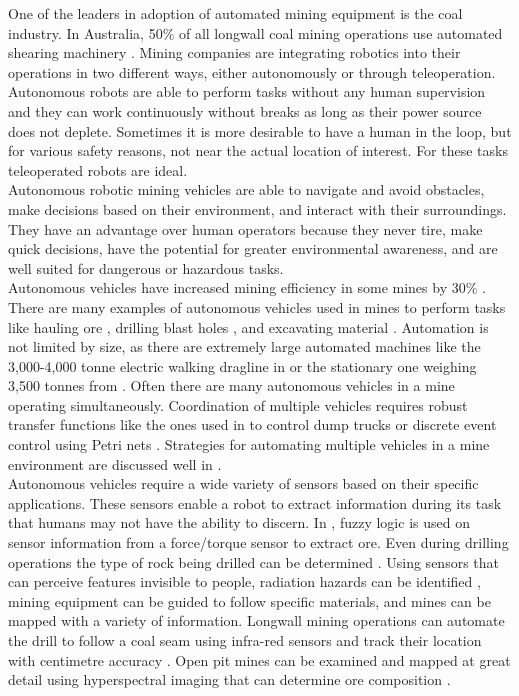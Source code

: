 One of the leaders in adoption of automated mining equipment is the coal industry. In Australia, 50\% of all longwall coal mining operations use automated shearing machinery \cite{auswall}. Mining companies are integrating robotics into their operations in two different ways, either autonomously or through teleoperation. Autonomous robots are able to perform tasks without any human supervision and they can work continuously without breaks as long as their power source does not deplete. Sometimes it is more desirable to have a human in the loop, but for various safety reasons, not near the actual location of interest. For these tasks teleoperated robots are ideal.\\

Autonomous robotic mining vehicles are able to navigate and avoid obstacles, make decisions based on their environment, and interact with their surroundings. They have an advantage over human operators because they never tire, make quick decisions, have the potential for greater environmental awareness, and are well suited for dangerous or hazardous tasks.\\

Autonomous vehicles have increased mining efficiency in some mines by 30\% \cite{30p}. There are many examples of autonomous vehicles used in mines to perform tasks like hauling ore \cite{haul}, drilling blast holes \cite{blast}, and excavating material \cite{excavate}. Automation is not limited by size, as there are extremely large automated machines like the 3,000-4,000 tonne electric walking dragline in \cite{large} or the stationary one weighing 3,500 tonnes from \cite{3500}. Often there are many autonomous vehicles in a mine operating simultaneously. Coordination of multiple vehicles requires robust transfer functions like the ones used in \cite{dump} to control dump trucks or discrete event control using Petri nets \cite{petri}. Strategies for automating multiple vehicles in a mine environment are discussed well in \cite{multi}.\\

Autonomous vehicles require a wide variety of sensors based on their specific applications. These sensors enable a robot to extract information during its task that humans may not have the ability to discern. In \cite{fuzzy}, fuzzy logic is used on sensor information from a force/torque sensor to extract ore. Even during drilling operations the type of rock being drilled can be determined \cite{drill}. Using sensors that can perceive features invisible to people, radiation hazards can be identified \cite{radio}, mining equipment can be guided to follow specific materials, and mines can be mapped with a variety of information. Longwall mining operations can automate the drill to follow a coal seam using infra-red sensors \cite{seam} and track their location with centimetre accuracy \cite{real}. Open pit mines can be examined and mapped at great detail using hyperspectral imaging that can determine ore composition \cite{spectral}.\\

